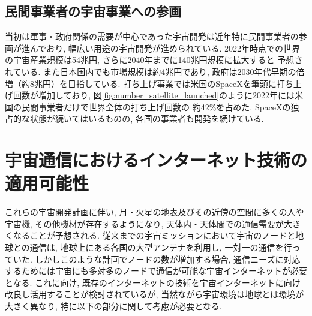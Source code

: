 
\subsection{民間事業者の宇宙事業への参画}
\label{section:民間事業者の宇宙事業への参画}
当初は軍事・政府関係の需要が中心であった宇宙開発は近年特に民間事業者の参画が進んでおり,
幅広い用途の宇宙開発が進められている. 
2022年時点での世界の宇宙産業規模は54兆円, さらに2040年までに140兆円規模に拡大すると
予想されている\cite{経産省2024}. また日本国内でも市場規模は約4兆円であり, 政府は2030年代早期の倍増（約8兆円）を目指している. 
打ち上げ事業では米国のSpaceXを筆頭に打ち上げ回数が増加しており, 
図\ref{fig:number_satellite_launched}のように2022年には米国の民間事業者だけで世界全体の打ち上げ回数の
約42\%を占めた. SpaceXの独占的な状態が続いてはいるものの, 各国の事業者も開発を続けている. 


\section{宇宙通信におけるインターネット技術の適用可能性}
\label{section:宇宙通信におけるインターネット技術の適用性}
これらの宇宙開発計画に伴い,  月・火星の地表及びその近傍の空間に多くの人や宇宙機, その他機材が存在するようになり, 
天体内・天体間での通信需要が大きくなることが予想される.  
従来までの宇宙ミッションにおいて宇宙のノードと地球との通信は,  地球上にある各国の大型アンテナを利用し,  一対一の通信を行っていた. 
しかしこのような計画でノードの数が増加する場合, 通信ニーズに対応するためには宇宙にも多対多のノードで通信が可能な宇宙インターネットが必要となる.  
これに向け, 既存のインターネットの技術を宇宙インターネットに向け改良し活用することが検討されているが, 
当然ながら宇宙環境は地球とは環境が大きく異なり, 特に以下の部分に関して考慮が必要となる. 

